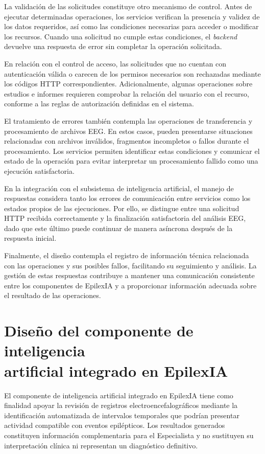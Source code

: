 La validación de las solicitudes constituye
otro mecanismo de control. Antes de ejecutar
determinadas operaciones, los servicios
verifican la presencia y validez de los datos
requeridos, así como las condiciones necesarias
para acceder o modificar los recursos.
Cuando una solicitud no cumple estas
condiciones, el \textit{backend} devuelve una respuesta
de error sin completar la operación solicitada.

En relación con el control de acceso,
las solicitudes que no cuentan con
autenticación válida o carecen de los
permisos necesarios son rechazadas mediante
los códigos HTTP correspondientes.
Adicionalmente, algunas operaciones sobre
estudios e informes requieren comprobar
la relación del usuario con el recurso,
conforme a las reglas de autorización
definidas en el sistema.

El tratamiento de errores también contempla
las operaciones de transferencia y
procesamiento de archivos EEG. En estos
casos, pueden presentarse situaciones
relacionadas con archivos inválidos,
fragmentos incompletos o fallos durante
el procesamiento. Los servicios permiten
identificar estas condiciones y comunicar
el estado de la operación para evitar
interpretar un procesamiento fallido
como una ejecución satisfactoria.

En la integración con el subsistema de
inteligencia artificial, el manejo de
respuestas considera tanto los errores
de comunicación entre servicios como
los estados propios de las ejecuciones.
Por ello, se distingue entre una solicitud
HTTP recibida correctamente y la finalización
satisfactoria del análisis EEG, dado que
este último puede continuar de manera
asíncrona después de la respuesta inicial.

Finalmente, el diseño contempla el registro
de información técnica relacionada con
las operaciones y sus posibles fallos,
facilitando su seguimiento y análisis.
La gestión de estas respuestas contribuye
a mantener una comunicación consistente
entre los componentes de EpilexIA y
a proporcionar información adecuada
sobre el resultado de las operaciones.


\section[Diseño del componente de inteligencia artificial integrado en EpilexIA]{Diseño del componente de inteligencia\\artificial integrado en EpilexIA}
\label{sec:diseno-componente-ia}

El componente de inteligencia artificial integrado en
EpilexIA tiene como finalidad apoyar la revisión de
registros electroencefalográficos mediante la
identificación automatizada de intervalos temporales
que podrían presentar actividad compatible con
eventos epilépticos. Los resultados generados
constituyen información complementaria para el
Especialista y no sustituyen su interpretación
clínica ni representan un diagnóstico definitivo.


